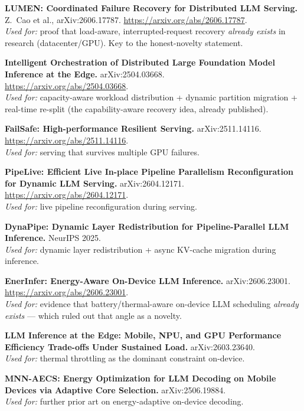 \begin{enumerate}[leftmargin=1.8em,label={[P\arabic*]}]
  \item \textbf{LUMEN: Coordinated Failure Recovery for Distributed LLM Serving.}
  Z.~Cao et al., arXiv:2606.17787. \url{https://arxiv.org/abs/2606.17787}. \\
  \emph{Used for:} proof that load-aware, interrupted-request recovery
  \emph{already exists} in research (datacenter/GPU). Key to the honest-novelty
  statement. \VER

  \item \textbf{Intelligent Orchestration of Distributed Large Foundation Model
  Inference at the Edge.} arXiv:2504.03668. \\
  \url{https://arxiv.org/abs/2504.03668}. \\
  \emph{Used for:} capacity-aware workload distribution + dynamic partition
  migration + real-time re-split (the capability-aware recovery idea, already
  published). \VER

  \item \textbf{FailSafe: High-performance Resilient Serving.} arXiv:2511.14116.
  \url{https://arxiv.org/abs/2511.14116}. \\
  \emph{Used for:} serving that survives multiple GPU failures. \VER

  \item \textbf{PipeLive: Efficient Live In-place Pipeline Parallelism
  Reconfiguration for Dynamic LLM Serving.} arXiv:2604.12171. \\
  \url{https://arxiv.org/abs/2604.12171}. \\
  \emph{Used for:} live pipeline reconfiguration during serving. \VER

  \item \textbf{DynaPipe: Dynamic Layer Redistribution for Pipeline-Parallel LLM
  Inference.} NeurIPS 2025. \\
  \emph{Used for:} dynamic layer redistribution + async KV-cache migration during
  inference. \VER

  \item \textbf{EnerInfer: Energy-Aware On-Device LLM Inference.}
  arXiv:2606.23001. \url{https://arxiv.org/abs/2606.23001}. \\
  \emph{Used for:} evidence that battery/thermal-aware on-device LLM scheduling
  \emph{already exists} --- which ruled out that angle as a novelty. \VER

  \item \textbf{LLM Inference at the Edge: Mobile, NPU, and GPU Performance
  Efficiency Trade-offs Under Sustained Load.} arXiv:2603.23640. \\
  \emph{Used for:} thermal throttling as the dominant constraint on-device. \VER

  \item \textbf{MNN-AECS: Energy Optimization for LLM Decoding on Mobile Devices
  via Adaptive Core Selection.} arXiv:2506.19884. \\
  \emph{Used for:} further prior art on energy-adaptive on-device decoding. \VER
\end{enumerate}

